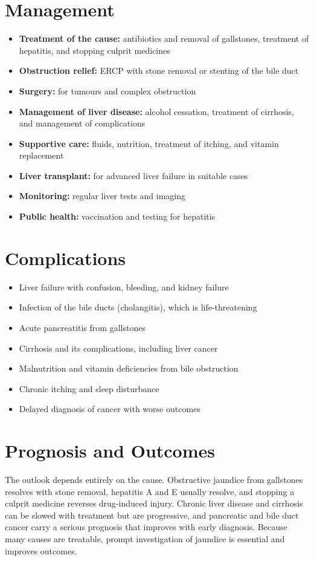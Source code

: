\section*{Management}
\begin{itemize}
    \item \textbf{Treatment of the cause:} antibiotics and removal of gallstones, treatment of hepatitis, and stopping culprit medicines
    \item \textbf{Obstruction relief:} ERCP with stone removal or stenting of the bile duct
    \item \textbf{Surgery:} for tumours and complex obstruction
    \item \textbf{Management of liver disease:} alcohol cessation, treatment of cirrhosis, and management of complications
    \item \textbf{Supportive care:} fluids, nutrition, treatment of itching, and vitamin replacement
    \item \textbf{Liver transplant:} for advanced liver failure in suitable cases
    \item \textbf{Monitoring:} regular liver tests and imaging
    \item \textbf{Public health:} vaccination and testing for hepatitis
\end{itemize}

\section*{Complications}
\begin{itemize}
    \item Liver failure with confusion, bleeding, and kidney failure
    \item Infection of the bile ducts (cholangitis), which is life-threatening
    \item Acute pancreatitis from gallstones
    \item Cirrhosis and its complications, including liver cancer
    \item Malnutrition and vitamin deficiencies from bile obstruction
    \item Chronic itching and sleep disturbance
    \item Delayed diagnosis of cancer with worse outcomes
\end{itemize}

\section*{Prognosis and Outcomes}
The outlook depends entirely on the cause. Obstructive jaundice from gallstones resolves with stone removal, hepatitis A and E usually resolve, and stopping a culprit medicine reverses drug-induced injury. Chronic liver disease and cirrhosis can be slowed with treatment but are progressive, and pancreatic and bile duct cancer carry a serious prognosis that improves with early diagnosis. Because many causes are treatable, prompt investigation of jaundice is essential and improves outcomes.


